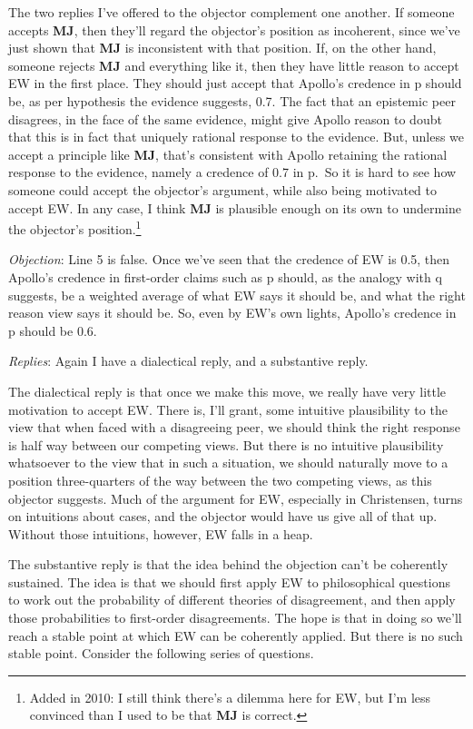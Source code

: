 \documentclass[
  10pt,
  letterpaper,
  DIV=11,
  numbers=noendperiod,
  twoside]{scrartcl}
\begin{document}
The two replies I've offered to the objector complement one another. If
someone accepts \textbf{MJ}, then they'll regard the objector's position
as incoherent, since we've just shown that \textbf{MJ} is inconsistent
with that position. If, on the other hand, someone rejects \textbf{MJ}
and everything like it, then they have little reason to accept EW in the
first place. They should just accept that Apollo's credence in p should
be, as per hypothesis the evidence suggests, 0.7. The fact that an
epistemic peer disagrees, in the face of the same evidence, might give
Apollo reason to doubt that this is in fact that uniquely rational
response to the evidence. But, unless we accept a principle like
\textbf{MJ}, that's consistent with Apollo retaining the rational
response to the evidence, namely a credence of 0.7 in p.~So it is hard
to see how someone could accept the objector's argument, while also
being motivated to accept EW. In any case, I think \textbf{MJ} is
plausible enough on its own to undermine the objector's
position.\footnote{Added in 2010: I still think there's a dilemma here
  for EW, but I'm less convinced than I used to be that \textbf{MJ} is
  correct.}

\emph{Objection}: Line 5 is false. Once we've seen that the credence of
EW is 0.5, then Apollo's credence in first-order claims such as p
should, as the analogy with q suggests, be a weighted average of what EW
says it should be, and what the right reason view says it should be. So,
even by EW's own lights, Apollo's credence in p should be 0.6.

\emph{Replies}: Again I have a dialectical reply, and a substantive
reply.

The dialectical reply is that once we make this move, we really have
very little motivation to accept EW. There is, I'll grant, some
intuitive plausibility to the view that when faced with a disagreeing
peer, we should think the right response is half way between our
competing views. But there is no intuitive plausibility whatsoever to
the view that in such a situation, we should naturally move to a
position three-quarters of the way between the two competing views, as
this objector suggests. Much of the argument for EW, especially in
Christensen, turns on intuitions about cases, and the objector would
have us give all of that up. Without those intuitions, however, EW falls
in a heap.

The substantive reply is that the idea behind the objection can't be
coherently sustained. The idea is that we should first apply EW to
philosophical questions to work out the probability of different
theories of disagreement, and then apply those probabilities to
first-order disagreements. The hope is that in doing so we'll reach a
stable point at which EW can be coherently applied. But there is no such
stable point. Consider the following series of questions.
\end{document}
